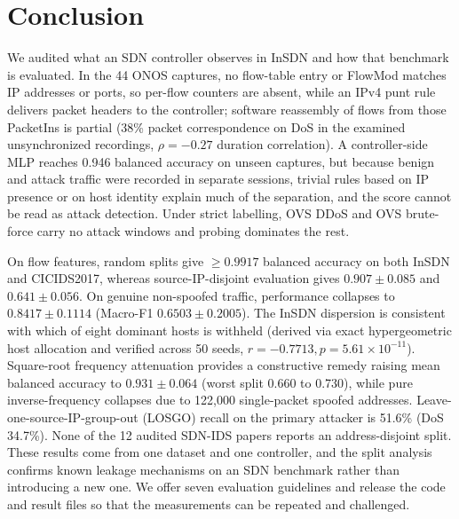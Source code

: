 \documentclass[journal]{IEEEtran}
\begin{document}
\section{Conclusion}\label{sec:conclusion}
We audited what an SDN controller observes in InSDN and how that benchmark is evaluated. In the 44 ONOS captures, no flow-table entry or FlowMod matches IP addresses or ports, so per-flow counters are absent, while an IPv4 punt rule delivers packet headers to the controller; software reassembly of flows from those PacketIns is partial (38\% packet correspondence on DoS in the examined unsynchronized recordings, $\rho=-0.27$ duration correlation). A controller-side MLP reaches 0.946 balanced accuracy on unseen captures, but because benign and attack traffic were recorded in separate sessions, trivial rules based on IP presence or on host identity explain much of the separation, and the score cannot be read as attack detection. Under strict labelling, OVS DDoS and OVS brute-force carry no attack windows and probing dominates the rest.

On flow features, random splits give $\geq 0.9917$ balanced accuracy on both InSDN and CICIDS2017, whereas source-IP-disjoint evaluation gives $0.907\pm0.085$ and $0.641\pm0.056$. On genuine non-spoofed traffic, performance collapses to $0.8417\pm0.1114$ (Macro-F1 $0.6503\pm0.2005$). The InSDN dispersion is consistent with which of eight dominant hosts is withheld (derived via exact hypergeometric host allocation and verified across 50 seeds, $r=-0.7713, p=5.61\times 10^{-11}$). Square-root frequency attenuation provides a constructive remedy raising mean balanced accuracy to $0.931\pm0.064$ (worst split 0.660 to 0.730), while pure inverse-frequency collapses due to 122,000 single-packet spoofed addresses. Leave-one-source-IP-group-out (LOSGO) recall on the primary attacker is 51.6\% (DoS 34.7\%). None of the 12 audited SDN-IDS papers reports an address-disjoint split. These results come from one dataset and one controller, and the split analysis confirms known leakage mechanisms on an SDN benchmark rather than introducing a new one. We offer seven evaluation guidelines and release the code and result files so that the measurements can be repeated and challenged.

\appendices
\end{document}

